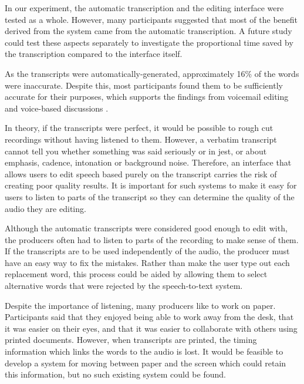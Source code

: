In our experiment, the automatic transcription and the editing interface were
tested as a whole. However, many participants suggested that most of the
benefit derived from the system came from the automatic transcription. A future
study could test these aspects separately to investigate the proportional time
saved by the transcription compared to the interface itself.

As the transcripts were automatically-generated, approximately 16\% of the
words were inaccurate. Despite this, most participants found them to be
sufficiently accurate for their purposes, which supports the findings from
voicemail editing \citep{Whittaker2004} and voice-based discussions
\citep{Sivaraman2016}. 

In theory, if the transcripts were perfect, it would be possible to rough cut
recordings without having listened to them. However, a verbatim transcript
cannot tell you whether something was said seriously or in jest, or about
emphasis, cadence, intonation or background noise. Therefore, an interface that
allows users to edit speech based purely on the transcript carries the risk of
creating poor quality results. It is important for such systems to make it easy
for users to listen to parts of the transcript so they can determine the
quality of the audio they are editing.

Although the automatic transcripts were considered good enough to edit with,
the producers often had to listen to parts of the recording to make sense of
them. If the transcripts are to be used independently of the audio, the
producer must have an easy way to fix the mistakes. Rather than make the user
type out each replacement word, this process could be aided by allowing them to
select alternative words that were rejected by the speech-to-text system.

Despite the importance of listening, many producers like to work on paper.
Participants said that they enjoyed being able to work away from the desk, that
it was easier on their eyes, and that it was easier to collaborate with others
using printed documents. However, when transcripts are printed, the timing
information which links the words to the audio is lost. It would be feasible 
to develop a system for moving between paper and the screen which could
retain this information, but no such existing system could be found.

